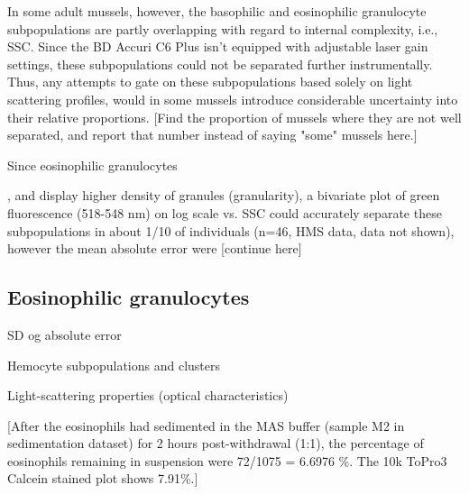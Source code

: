 In some adult mussels, however, the basophilic and eosinophilic granulocyte subpopulations are partly overlapping with regard to internal complexity, i.e., SSC. Since the BD Accuri C6 Plus isn't equipped with adjustable laser gain settings, these subpopulations could not be separated further instrumentally. Thus, any attempts to gate on these subpopulations based solely on light scattering profiles, would in some mussels introduce considerable uncertainty into their relative proportions. [Find the proportion of mussels where they are not well separated, and report that number instead of saying "some" mussels here.]

Since eosinophilic granulocytes 

, and display higher density of granules (granularity), a bivariate plot of green fluorescence (518-548 nm) on log scale vs. SSC could accurately separate these subpopulations in about 1/10 of individuals (n=46, HMS data, data not shown), however the mean absolute error were [continue here]



\subsection{Eosinophilic granulocytes}


SD og absolute error

Hemocyte subpopulations and clusters

Light-scattering properties (optical characteristics)

[After the eosinophils had sedimented in the MAS buffer (sample M2 in sedimentation dataset) for 2 hours post-withdrawal (1:1), the percentage of eosinophils remaining in suspension were 72/1075 = 6.6976 \%. The 10k ToPro3 Calcein stained plot shows 7.91\%.]

